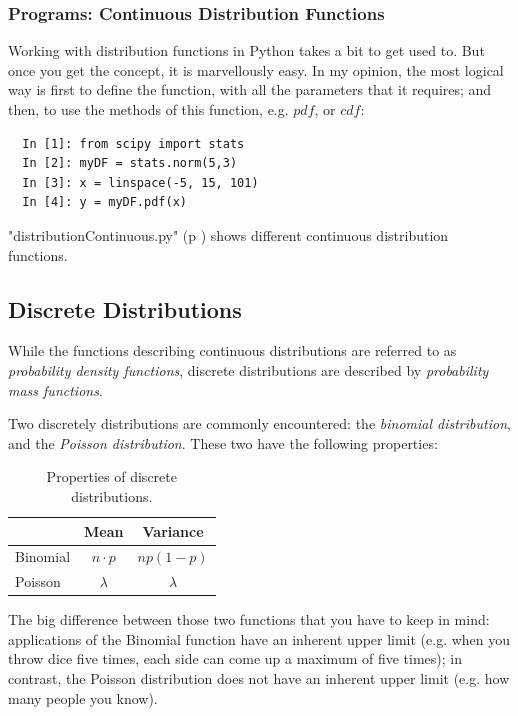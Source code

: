 \subsubsection{Programs: Continuous Distribution Functions}

Working with distribution functions in Python takes a bit to get used to. But once you get the concept, it is marvellously easy. In my opinion, the most logical way is first to define the function, with all the parameters that it requires; and then, to use the methods of this function, e.g. $pdf$, or $cdf$:

\begin{lstlisting}
  In [1]: from scipy import stats
  In [2]: myDF = stats.norm(5,3)
  In [3]: x = linspace(-5, 15, 101)
  In [4]: y = myDF.pdf(x)
\end{lstlisting}

\PyImg "distributionContinuous.py" (p \pageref{py:continuous}) shows different continuous distribution functions.

\subsection{Discrete Distributions}

While the functions describing continuous distributions are referred to as \emph{probability density functions}, discrete distributions are described by \emph{probability mass functions}.

Two discretely distributions are commonly encountered: the \emph{binomial distribution}, and the \emph{Poisson distribution}. These two have the following properties:

\begin{table}[h]
  \centering
  \begin{tabular}{l|c|c|}
      & Mean & Variance \\
      \hline
      Binomial & $n \cdot p$ & $np(1-p)$ \\
      Poisson & $\lambda$ & $\lambda$ \\
  \end{tabular}
\caption{Properties of discrete distributions.}
\end{table}

The big difference between those two functions that you have to keep in mind: applications of the Binomial function have an inherent upper limit (e.g. when you throw dice five times, each side can come up a maximum of five times); in contrast, the Poisson distribution does not have an inherent upper limit (e.g. how many people you know).

